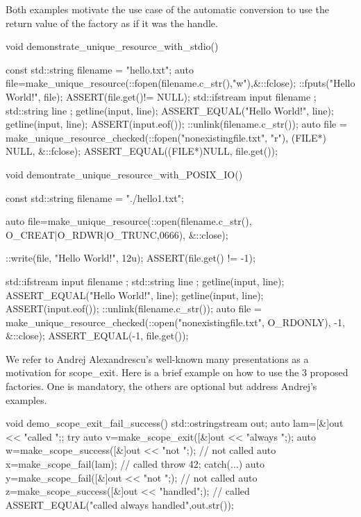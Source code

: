 \documentclass[ebook,11pt,article]{memoir}
\begin{document}
Both examples motivate the use case of the automatic conversion to use the return value of the factory as if it was the handle. 

\begin{codeblock}
void demonstrate_unique_resource_with_stdio() {
  const std::string filename = "hello.txt";
  {
    auto file=make_unique_resource(::fopen(filename.c_str(),"w"),&::fclose);
    ::fputs("Hello World!\n", file);
    ASSERT(file.get()!= NULL);
  }
  {
    std::ifstream input { filename };
    std::string line { };
    getline(input, line);
    ASSERT_EQUAL("Hello World!", line);
    getline(input, line);
    ASSERT(input.eof());
  }
  ::unlink(filename.c_str());
  {
    auto file = make_unique_resource_checked(::fopen("nonexistingfile.txt", "r"), 
                (FILE*) NULL, &::fclose);
    ASSERT_EQUAL((FILE*)NULL, file.get());
  }

}
\end{codeblock}

\newpage
\begin{codeblock}
void demontrate_unique_resource_with_POSIX_IO() {
  const std::string filename = "./hello1.txt";
  {
    auto file=make_unique_resource(::open(filename.c_str(),
                     O_CREAT|O_RDWR|O_TRUNC,0666), &::close);
    
    ::write(file, "Hello World!\n", 12u);
    ASSERT(file.get() != -1);
  }
  {
    std::ifstream input { filename };
    std::string line { };
    getline(input, line);
    ASSERT_EQUAL("Hello World!", line);
    getline(input, line);
    ASSERT(input.eof());
  }
  ::unlink(filename.c_str());
  {
    auto file = make_unique_resource_checked(::open("nonexistingfile.txt", 
                       O_RDONLY), -1, &::close);
    ASSERT_EQUAL(-1, file.get());
  }

}\end{codeblock}

We refer to Andrej Alexandrescu's well-known many presentations as a motivation for scope_exit. Here is a brief example on how to use the 3 proposed factories. One is mandatory, the others are optional but address Andrej's examples.

\begin{codeblock}
void demo_scope_exit_fail_success(){
  std::ostringstream out{};
  auto lam=[&]{out << "called ";};
  try{
    auto v=make_scope_exit([&]{out << "always ";});
    auto w=make_scope_success([&]{out << "not ";}); // not called
    auto x=make_scope_fail(lam); // called
    throw 42;
  }catch(...){
    auto y=make_scope_fail([&]{out << "not ";}); // not called
    auto z=make_scope_success([&]{out << "handled";}); // called
  }
  ASSERT_EQUAL("called always handled",out.str());
}
\end{codeblock}
\end{document}
